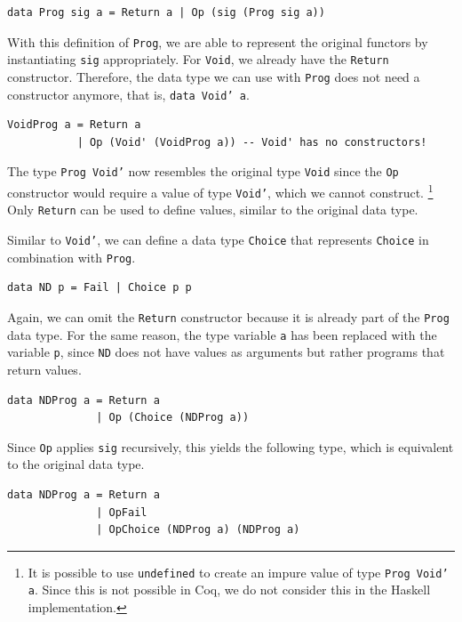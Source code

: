 \documentclass[a4paper, 11pt, fleqn, twoside]{scrreprt}
\newcommand{\hinl}[1]{\texttt{#1}}
\begin{document}
\begin{verbatim}
data Prog sig a = Return a | Op (sig (Prog sig a))
\end{verbatim}

With this definition of \hinl{Prog}, we are able to represent the original functors by instantiating \hinl{sig} appropriately.
For \hinl{Void}, we already have the \hinl{Return} constructor.
Therefore, the data type we can use with \hinl{Prog} does not need a constructor anymore, that is, \hinl{data Void' a}.

\begin{verbatim}
VoidProg a = Return a
           | Op (Void' (VoidProg a)) -- Void' has no constructors!
\end{verbatim}

The type \hinl{Prog Void'} now resembles the original type  \hinl{Void} since the \hinl{Op} constructor  would require a value of type \hinl{Void'}, which we cannot  construct.
\footnote{It is possible to use \hinl{undefined} to create an impure value of type \hinl{Prog Void' a}.
Since this  is not possible in Coq, we do not consider this in the Haskell implementation.}
Only \hinl{Return} can be used to define values, similar to the  original data type.

Similar to \hinl{Void'}, we can define a data type  \hinl{Choice} that represents \hinl{Choice} in combination with \hinl{Prog}.

\label{min:ND}
\begin{verbatim}
data ND p = Fail | Choice p p
\end{verbatim}

Again, we can omit the \hinl{Return} constructor because it is  already part of the \hinl{Prog} data type.
For the same reason,  the type variable \hinl{a} has been replaced with the variable \hinl{p}, since \hinl{ND} does not have values as arguments but rather programs that return values.

\begin{verbatim}
data NDProg a = Return a
              | Op (Choice (NDProg a))
\end{verbatim}

Since \hinl{Op} applies \hinl{sig} recursively,  this yields the following type, which is equivalent to the original data type.

\begin{verbatim}
data NDProg a = Return a
              | OpFail
              | OpChoice (NDProg a) (NDProg a)
\end{verbatim}
\end{document}
